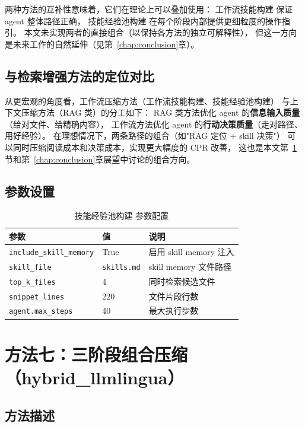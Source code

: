 两种方法的互补性意味着，它们在理论上可以叠加使用：
工作流技能构建 保证 agent 整体路径正确，
技能经验池构建 在每个阶段内部提供更细粒度的操作指引。
本文未实现两者的直接组合（以保持各方法的独立可解释性），
但这一方向是未来工作的自然延伸（见第~\ref{chap:conclusion}章）。

\subsection{与检索增强方法的定位对比}

从更宏观的角度看，工作流压缩方法（工作流技能构建、技能经验池构建）
与上下文压缩方法（RAG 类）的分工如下：
RAG 类方法优化 agent 的\textbf{信息输入质量}（给对文件、给精确内容），
工作流方法优化 agent 的\textbf{行动决策质量}（走对路径、用好经验）。
在理想情况下，两条路径的组合（如"RAG 定位 + skill 决策"）
可以同时压缩阅读成本和决策成本，实现更大幅度的 CPR 改善，
这也是本文第~\ref{sec:hybrid}节和第~\ref{chap:conclusion}章展望中讨论的组合方向。

\subsection{参数设置}

\begin{table}[htbp]
\centering
\caption{技能经验池构建 参数配置}
\label{tab:skill-mem-params}
\begin{tabular}{lll}
\toprule
参数 & 值 & 说明 \\
\midrule
\texttt{include\_skill\_memory} & True & 启用 skill memory 注入 \\
\texttt{skill\_file} & \texttt{skills.md} & skill memory 文件路径 \\
\texttt{top\_k\_files} & 4 & 同时检索候选文件 \\
\texttt{snippet\_lines} & 220 & 文件片段行数 \\
\texttt{agent.max\_steps} & 40 & 最大执行步数 \\
\bottomrule
\end{tabular}
\end{table}


\section{方法七：三阶段组合压缩（hybrid\_llmlingua）}
\label{sec:hybrid}

\subsection{方法描述}

